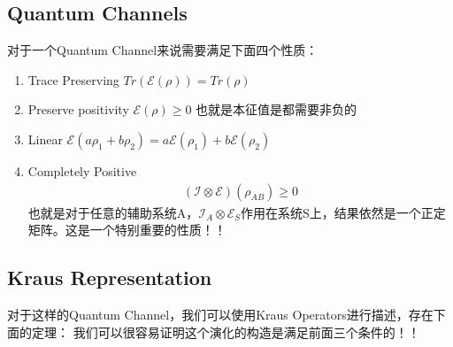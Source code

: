 \subsection{Quantum Channels}


对于一个Quantum Channel来说需要满足下面四个性质：
\begin{enumerate}
  \item Trace Preserving $ Tr(\mathcal{E}(\rho)) = Tr(\rho) $
  \item Preserve positivity $ \mathcal{E}(\rho) \geq 0 $ 也就是本征值是都需要非负的
  \item Linear $ \mathcal{E}(a\rho_1 + b\rho_2) = a\mathcal{E}(\rho_1) + b\mathcal{E}(\rho_2) $
  \item Completely Positive
    \begin{align}
      (\mathcal{I} \otimes \mathcal{E})(\rho_{AB}) \geq 0
    \end{align}
    也就是对于任意的辅助系统A，$ \mathcal{I}_A \otimes \mathcal{E}_S $作用在系统S上，结果依然是一个正定矩阵。这是一个特别重要的性质！！
\end{enumerate}

\subsection{Kraus Representation}

\bigskip
{}

对于这样的Quantum Channel，我们可以使用Kraus Operators进行描述，存在下面的定理：
我们可以很容易证明这个演化的构造是满足前面三个条件的！！

\bigskip
{}

